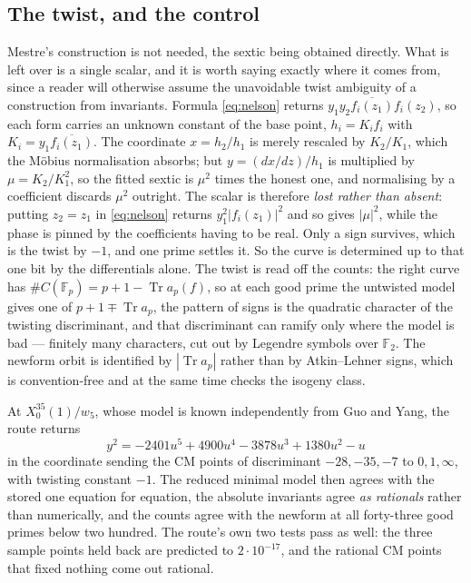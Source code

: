 \documentclass[11pt,reqno]{amsart}
\theoremstyle{plain}
\theoremstyle{definition}
\newcommand{\F}{\mathbb{F}}
\begin{document}
\subsection*{The twist, and the control}
Mestre's construction is not needed, the sextic being obtained directly. What is left over is a
single scalar, and it is worth saying exactly where it comes from, since a reader will otherwise
assume the unavoidable twist ambiguity of a construction from invariants. Formula \eqref{eq:nelson}
returns $y_1y_2\overline{f_i(z_1)}f_i(z_2)$, so each form carries an unknown constant of the base
point, $h_i=K_if_i$ with $K_i=y_1\overline{f_i(z_1)}$. The coordinate $x=h_2/h_1$ is merely
rescaled by $K_2/K_1$, which the M\"obius normalisation absorbs; but $y=(dx/dz)/h_1$ is multiplied
by $\mu=K_2/K_1^{2}$, so the fitted sextic is $\mu^{2}$ times the honest one, and normalising by a
coefficient discards $\mu^{2}$ outright. The scalar is therefore \emph{lost rather than absent}:
putting $z_2=z_1$ in \eqref{eq:nelson} returns $y_1^{2}\lvert f_i(z_1)\rvert^{2}$ and so gives
$\lvert\mu\rvert^{2}$, while the phase is pinned by the coefficients having to be real. Only a sign
survives, which is the twist by $-1$, and one prime settles it. So the curve is determined up to
that one bit by the differentials alone. The twist is read
off the counts: the right curve has $\#C(\F_p)=p+1-\operatorname{Tr}a_p(f)$, so at each good prime
the untwisted model gives one of $p+1\mp\operatorname{Tr}a_p$, the pattern of signs is the
quadratic character of the twisting discriminant, and that discriminant can ramify only where the
model is bad --- finitely many characters, cut out by Legendre symbols over $\F_2$. The newform
orbit is identified by $|\operatorname{Tr}a_p|$ rather than by Atkin--Lehner signs, which is
convention-free and at the same time checks the isogeny class.

At $X_0^{35}(1)/w_5$, whose model is known independently from Guo and Yang, the route returns
\[
  y^2=-2401u^5+4900u^4-3878u^3+1380u^2-u
\]
in the coordinate sending the CM points of discriminant $-28,-35,-7$ to $0,1,\infty$, with
twisting constant $-1$. The reduced minimal model then agrees with the stored one equation for
equation, the absolute invariants agree \emph{as rationals} rather than numerically, and the counts
agree with the newform at all forty-three good primes below two hundred. The route's own two tests
pass as well: the three sample points held back are predicted to $2\cdot10^{-17}$, and the rational
CM points that fixed nothing come out rational.
\end{document}
